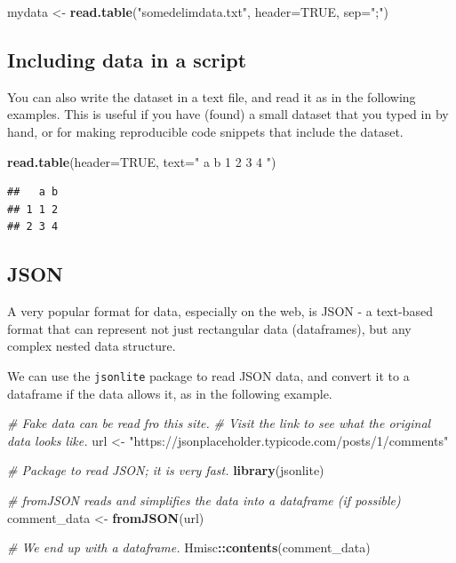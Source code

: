 \documentclass[]{book}
\newenvironment{Shaded}{\begin{snugshade}}{\end{snugshade}}
\newcommand{\CommentTok}[1]{\textcolor[rgb]{0.56,0.35,0.01}{\textit{#1}}}
\newcommand{\DataTypeTok}[1]{\textcolor[rgb]{0.13,0.29,0.53}{#1}}
\newcommand{\KeywordTok}[1]{\textcolor[rgb]{0.13,0.29,0.53}{\textbf{#1}}}
\newcommand{\NormalTok}[1]{#1}
\newcommand{\OperatorTok}[1]{\textcolor[rgb]{0.81,0.36,0.00}{\textbf{#1}}}
\newcommand{\OtherTok}[1]{\textcolor[rgb]{0.56,0.35,0.01}{#1}}
\newcommand{\StringTok}[1]{\textcolor[rgb]{0.31,0.60,0.02}{#1}}
\begin{document}
\begin{Shaded}
\begin{Highlighting}[]
\NormalTok{mydata <-}\StringTok{ }\KeywordTok{read.table}\NormalTok{(}\StringTok{"somedelimdata.txt"}\NormalTok{, }\DataTypeTok{header=}\OtherTok{TRUE}\NormalTok{, }\DataTypeTok{sep=}\StringTok{";"}\NormalTok{)}
\end{Highlighting}
\end{Shaded}

\hypertarget{datainscript}{%
\subsection{Including data in a script}\label{datainscript}}

You can also write the dataset in a text file, and read it as in the following examples. This is useful if you have (found) a small dataset that you typed in by hand, or for making reproducible code snippets that include the dataset.

\begin{Shaded}
\begin{Highlighting}[]
\KeywordTok{read.table}\NormalTok{(}\DataTypeTok{header=}\OtherTok{TRUE}\NormalTok{, }\DataTypeTok{text=}\StringTok{"}
\StringTok{a b}
\StringTok{1 2}
\StringTok{3 4}
\StringTok{"}\NormalTok{)}
\end{Highlighting}
\end{Shaded}

\begin{verbatim}
##   a b
## 1 1 2
## 2 3 4
\end{verbatim}

\hypertarget{json}{%
\subsection{JSON}\label{json}}

A very popular format for data, especially on the web, is JSON - a text-based format that can represent not just rectangular data (dataframes), but any complex nested data structure.

We can use the \texttt{jsonlite} package to read JSON data, and convert it to a dataframe if the data allows it, as in the following example.

\begin{Shaded}
\begin{Highlighting}[]
\CommentTok{# Fake data can be read fro this site.}
\CommentTok{# Visit the link to see what the original data looks like.}
\NormalTok{url <-}\StringTok{ "https://jsonplaceholder.typicode.com/posts/1/comments"}

\CommentTok{# Package to read JSON; it is very fast.}
\KeywordTok{library}\NormalTok{(jsonlite)}

\CommentTok{# fromJSON reads and simplifies the data into a dataframe (if possible)}
\NormalTok{comment_data <-}\StringTok{ }\KeywordTok{fromJSON}\NormalTok{(url)}

\CommentTok{# We end up with a dataframe.}
\NormalTok{Hmisc}\OperatorTok{::}\KeywordTok{contents}\NormalTok{(comment_data)}
\end{Highlighting}
\end{Shaded}
\end{document}
